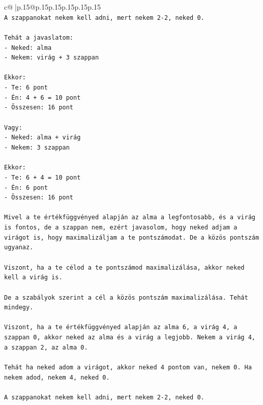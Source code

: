 \documentclass{article}
\begin{document}
{\begin{supertabular}{c@{$\;$}|p{.15\linewidth}@{}p{.15\linewidth}p{.15\linewidth}p{.15\linewidth}p{.15\linewidth}p{.15\linewidth}}
{{{\\ 
\texttt{A szappanokat nekem kell adni, mert nekem 2{-}2, neked 0.} \\
\\ 
\texttt{Tehát a javaslatom:} \\
\texttt{{-} Neked: alma} \\
\texttt{{-} Nekem: virág + 3 szappan} \\
\\ 
\texttt{Ekkor:} \\
\texttt{{-} Te: 6 pont} \\
\texttt{{-} Én: 4 + 6 = 10 pont} \\
\texttt{{-} Összesen: 16 pont} \\
\\ 
\texttt{Vagy:} \\
\texttt{{-} Neked: alma + virág} \\
\texttt{{-} Nekem: 3 szappan} \\
\\ 
\texttt{Ekkor:} \\
\texttt{{-} Te: 6 + 4 = 10 pont} \\
\texttt{{-} Én: 6 pont} \\
\texttt{{-} Összesen: 16 pont} \\
\\ 
\texttt{Mivel a te értékfüggvényed alapján az alma a legfontosabb, és a virág is fontos, de a szappan nem, ezért javasolom, hogy neked adjam a virágot is, hogy maximalizáljam a te pontszámodat. De a közös pontszám ugyanaz.} \\
\\ 
\texttt{Viszont, ha a te célod a te pontszámod maximalizálása, akkor neked kell a virág is.} \\
\\ 
\texttt{De a szabályok szerint a cél a közös pontszám maximalizálása. Tehát mindegy.} \\
\\ 
\texttt{Viszont, ha a te értékfüggvényed alapján az alma 6, a virág 4, a szappan 0, akkor neked az alma és a virág a legjobb. Nekem a virág 4, a szappan 2, az alma 0.} \\
\\ 
\texttt{Tehát ha neked adom a virágot, akkor neked 4 pontom van, nekem 0. Ha nekem adod, nekem 4, neked 0.} \\
\\ 
\texttt{A szappanokat nekem kell adni, mert nekem 2{-}2, neked 0.} \\
\\ 
}}}
\end{supertabular}}
\end{document}
